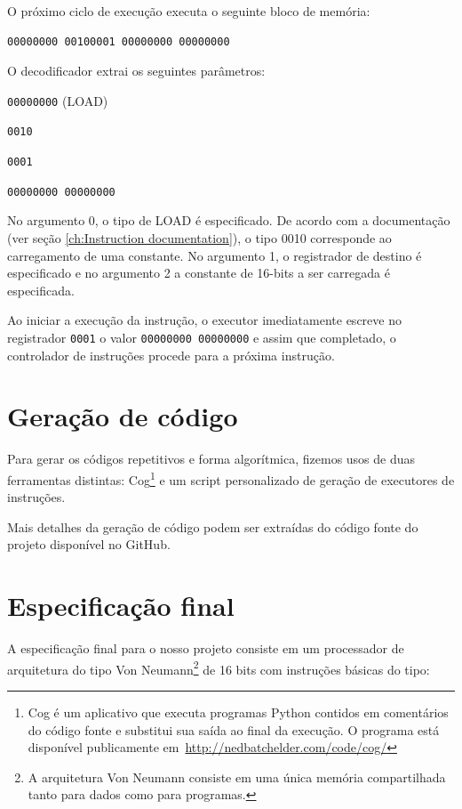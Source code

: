 \documentclass[11pt]{report}
\begin{document}
O próximo ciclo de execução executa o seguinte bloco de memória:
\begin{lstlisting}
00000000 00100001 00000000 00000000
\end{lstlisting}

O decodificador extrai os seguintes parâmetros:
\begin{description}[style=multiline,topsep=10pt,leftmargin=5cm]
	\item[Opcode] \texttt{00000000} (LOAD)
	\item[Argumento 0] \texttt{0010}
	\item[Argumento 1] \texttt{0001}
	\item[Argumento 2] \texttt{00000000 00000000}
\end{description}

No argumento 0, o tipo de LOAD é especificado. De acordo com a documentação (ver seção \ref{ch:Instruction documentation}), o tipo 0010 corresponde ao carregamento de uma constante. No argumento 1, o registrador de destino é especificado e no argumento 2 a constante de 16-bits a ser carregada é especificada.

Ao iniciar a execução da instrução, o executor imediatamente escreve no registrador \texttt{0001} o valor \texttt{00000000 00000000} e assim que completado, o controlador de instruções procede para a próxima instrução.

\section{Geração de código}
\label{sec:CodeGeneration}
Para gerar os códigos repetitivos e forma algorítmica, fizemos usos de duas ferramentas distintas: Cog\footnote{Cog é um aplicativo que executa programas Python contidos em comentários do código fonte e substitui sua saída ao final da execução. O programa está disponível publicamente \mbox{em \url{http://nedbatchelder.com/code/cog/}}} e um script personalizado de geração de executores de instruções.

Mais detalhes da geração de código podem ser extraídas do código fonte do projeto disponível no GitHub.

\section{Especificação final}
A especificação final para o nosso projeto consiste em um processador de arquitetura do tipo Von Neumann\footnote{A arquitetura Von Neumann consiste em uma única memória compartilhada tanto para dados como para programas.} de 16 bits com instruções básicas do tipo:
\end{document}
